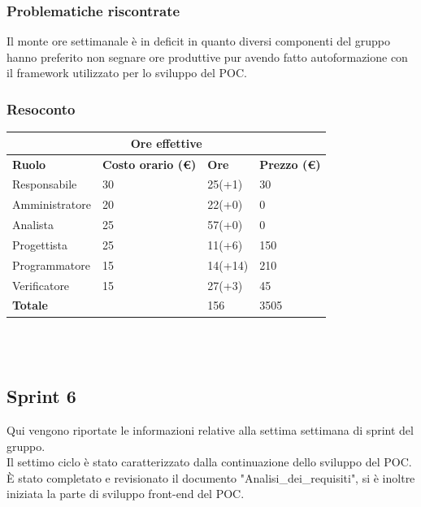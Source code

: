 \documentclass[9pt]{article}
\begin{document}
\subsubsection{Problematiche riscontrate}
Il monte ore settimanale è in deficit in quanto diversi componenti del gruppo hanno preferito non segnare ore produttive pur avendo fatto autoformazione con il framework utilizzato per lo sviluppo del POC.
\subsubsection{Resoconto}
\begin{center}
	\begin{tabularx}{\textwidth}{|X|X|X|X|}
		\hline
		\multicolumn{4}{|c|}{\textbf{Ore effettive}}                                      \\
		\hline
		\hline
		\textbf{Ruolo}  & \textbf{Costo orario (\euro)} & \textbf{Ore} & \textbf{Prezzo (\euro)} \\
		\hline
		Responsabile    & 30                            & 25(+1)       & 30                      \\
		\hline
		Amministratore  & 20                            & 22(+0)       & 0                       \\
		\hline
		Analista        & 25                            & 57(+0)       & 0                       \\
		\hline
		Progettista     & 25                            & 11(+6)       & 150                     \\
		\hline
		Programmatore   & 15                            & 14(+14)      & 210                     \\
		\hline
		Verificatore    & 15                            & 27(+3)       & 45                      \\
		\hline
		\hline
		\textbf{Totale} &                               & 156          & 3505                    \\
		\hline
	\end{tabularx}\\[8pt]
	\mbox{}\\
\end{center}

\subsection{Sprint 6}
Qui vengono riportate le informazioni relative alla settima settimana di sprint del gruppo. \\
Il settimo ciclo è stato caratterizzato dalla continuazione dello sviluppo del POC. \\
È stato completato e revisionato il documento "Analisi\_dei\_requisiti", si è inoltre iniziata la parte di sviluppo front-end del POC.
\end{document}
